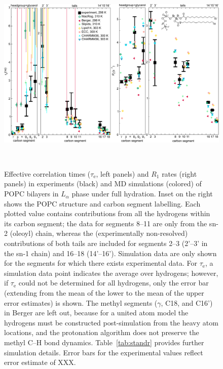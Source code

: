 \documentclass[journal=jpcbfk,manuscript=article,layout=twocolumn]{achemso}
\begin{document}
\begin{figure}[!ht]
\centering
\includegraphics[width=\textwidth]{./figures/normalcond_2020_3.pdf}
\caption{Effective correlation times ($\tau_\mathrm{e}$, left panels) and $R_{1}$ rates (right panels) in experiments (black) and MD simulations (colored) of POPC bilayers in $L_{\alpha}$ phase under full hydration.
Inset on the right shows the POPC structure and carbon segment labelling.
Each plotted value contains contributions from all the hydrogens within its carbon segment; the data for segments 8--11 are only from the sn-2 (oleoyl) chain, whereas the (experimentally non-resolved) contributions of both tails are included for segments 2--3 (2'--3' in the sn-1 chain) and 16--18 (14'--16').
%
Simulation data are only shown for the segments for which there exists experimental data.
%
For $\tau_\mathrm{e}$,
a simulation data point indicates the average over hydrogens; however,
if $\tau_\mathrm{e}$ could not be determined for all hydrogens, only the error bar
(extending from the mean of the lower to the mean of the upper error estimates) is shown.
%
The methyl segments ($\gamma$, C18, and C16') in Berger are left out, because for a united atom model the hydrogens must be constructed post-simulation from the heavy atom locations, and the protonation algorithm does not preserve the methyl C--H bond dynamics.
%
Table~\ref{tab:standr} provides further simulation details.
%
Error bars for the experimental values reflect error estimate of {\color{red}XXX}.
}
\label{fig:teff_R1}

\\

\end{figure}
\end{document}
